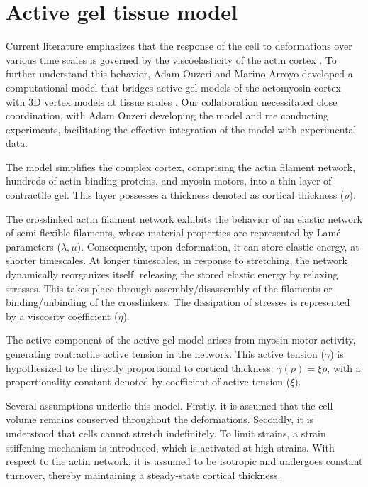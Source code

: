 \newpage

\hypertarget{active-gel-tissue-model}{%
	\section{Active gel tissue model}\label{active-gel-tissue-model}}

Current literature emphasizes that the response of the cell to deformations over various time scales is governed by the viscoelasticity of the actin cortex \cite{kelkar2020, clement2017, khalilgharibi2019}. To further understand this behavior, Adam Ouzeri and Marino Arroyo developed a computational model that bridges active gel models of the actomyosin cortex with 3D vertex models at tissue scales \cite{ouzeri2023}. Our collaboration necessitated close coordination, with Adam Ouzeri developing the model and me conducting experiments, facilitating the effective integration of the model with experimental data.

The model simplifies the complex cortex, comprising the actin filament network, hundreds of actin-binding proteins, and myosin motors, into a thin layer of contractile gel. This layer possesses a thickness denoted as cortical thickness (\(\rho\)).

The crosslinked actin filament network exhibits the behavior of an elastic network of semi-flexible filaments, whose material properties are represented by Lamé parameters  (\(\lambda,\mu\)). Consequently, upon deformation, it can store elastic energy, at shorter timescales. At longer timescales, in response to stretching, the network dynamically reorganizes itself, releasing the stored elastic energy by relaxing stresses. This takes place through assembly/disassembly of the filaments or binding/unbinding of the crosslinkers. The dissipation of stresses is represented by a viscosity coefficient (\(\eta\)).

The active component of the active gel model arises from myosin motor activity, generating contractile active tension in the network. This active tension (\(\gamma\)) is hypothesized to be directly proportional to cortical thickness:	$\gamma(\rho) = \xi \rho$, with a proportionality constant denoted by coefficient of active tension (\(\xi\)).

Several assumptions underlie this model. Firstly, it is assumed that the cell volume remains conserved throughout the deformations. Secondly, it is understood that cells cannot stretch indefinitely. To limit strains, a strain stiffening mechanism is introduced, which is activated at high strains. With respect to the actin network, it is assumed to be isotropic and undergoes constant turnover, thereby maintaining a steady-state cortical thickness.


